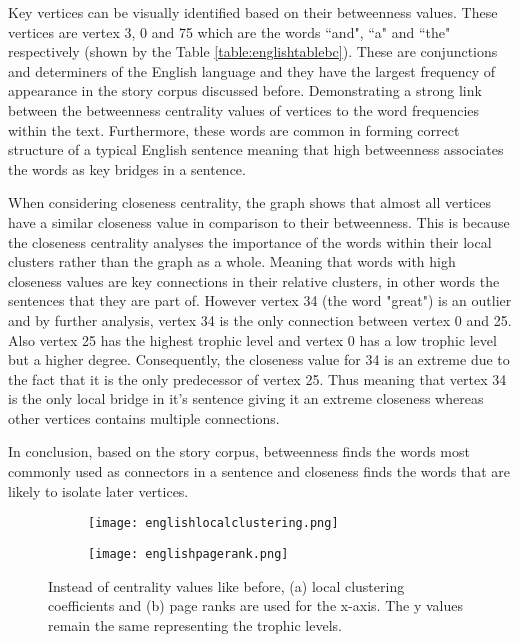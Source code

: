 Key vertices can be visually identified based on their betweenness values. These vertices are vertex 3, 0 and 75 which are the words ``and", ``a" and ``the" respectively (shown by the Table \ref{table:englishtablebc}). These are conjunctions and determiners of the English language and they have the largest frequency of appearance in the story corpus discussed before. Demonstrating a strong link between the betweenness centrality values of vertices to the word frequencies within the text. Furthermore, these words are common in forming correct structure of a typical English sentence meaning that high betweenness associates the words as key bridges in a sentence. 

When considering closeness centrality, the graph shows that almost all vertices have a similar closeness value in comparison to their betweenness. This is because the closeness centrality analyses the importance of the words within their local clusters rather than the graph as a whole. Meaning that words with high closeness values are key connections in their relative clusters, in other words the sentences that they are part of. However vertex 34 (the word "great") is an outlier and by further analysis, vertex 34 is the only connection between vertex 0 and 25. Also vertex 25 has the highest trophic level and vertex 0 has a low trophic level but a higher degree. Consequently, the closeness value for 34 is an extreme due to the fact that it is the only predecessor of vertex 25. Thus meaning that vertex 34 is the only local bridge in it's sentence giving it an extreme closeness whereas other vertices contains multiple connections.

In conclusion, based on the story corpus, betweenness finds the words most commonly used as connectors in a sentence and closeness finds the words that are likely to isolate later vertices.

\begin{figure}[H]
\centering
\begin{subfigure}{.45\textwidth}
	\hspace{-1cm} 
	\texttt{[image: englishlocalclustering.png]}
	\caption{}
	\label{fig:englc}
\end{subfigure}
\hfill
\begin{subfigure}{.45\textwidth}
	\hspace{-1cm} 
	\texttt{[image: englishpagerank.png]}
	\caption{}
	\label{fig:engpr}
\end{subfigure}
\caption{Instead of centrality values like before, (a) local clustering coefficients and (b) page ranks are used for the x-axis. The y values remain the same representing the trophic levels.}
\end{figure}

